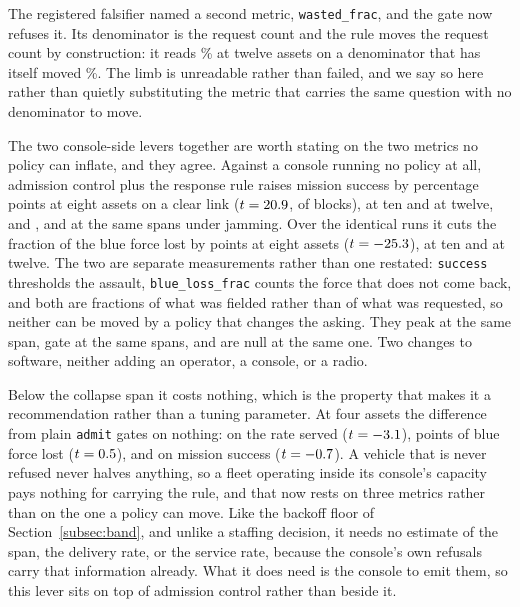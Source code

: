 \documentclass[11pt]{article}
\begin{document}
The registered falsifier named a second metric, \texttt{wasted\_frac}, and the gate now refuses it. Its denominator is the request count and the rule moves the request count by construction: it reads \abWfMove\% at twelve assets on a denominator that has itself moved \abWfDenom\%. The limb is unreadable rather than failed, and we say so here rather than quietly substituting the metric that carries the same question with no denominator to move.

The two console-side levers together are worth stating on the two metrics no policy can inflate, and they agree. Against a console running no policy at all, admission control plus the response rule raises mission success by \aiStackClearEight{} percentage points at eight assets on a clear link ($t = 20.9{}$, \aiStackClearEightBlocks{} of \aiBlocks{} blocks), \aiStackClearTen{} at ten and \aiStackClearTwelve{} at twelve, and \aiStackJamEight{}, \aiStackJamTen{} and \aiStackJamTwelve{} at the same spans under jamming. Over the identical runs it cuts the fraction of the blue force lost by \rtLossStackOverBlindClearEight{} points at eight assets ($t = -25.3{}$), \rtLossStackOverBlindClearTen{} at ten and \rtLossStackOverBlindClearTwelve{} at twelve. The two are separate measurements rather than one restated: \texttt{success} thresholds the assault, \texttt{blue\_loss\_frac} counts the force that does not come back, and both are fractions of what was fielded rather than of what was requested, so neither can be moved by a policy that changes the asking. They peak at the same span, gate at the same spans, and are null at the same one. Two changes to software, neither adding an operator, a console, or a radio.

Below the collapse span it costs nothing, which is the property that makes it a recommendation rather than a tuning parameter. At four assets the difference from plain \texttt{admit} gates on nothing: \rtServedAimdOverAdmitClearFour{} on the rate served ($t = -3.1{}$), \rtLossAimdOverAdmitClearFour{} points of blue force lost ($t = 0.5{}$), and \aiSuccClearGainFour{} on mission success ($t = -0.7{}$). A vehicle that is never refused never halves anything, so a fleet operating inside its console's capacity pays nothing for carrying the rule, and that now rests on three metrics rather than on the one a policy can move. Like the backoff floor of Section~\ref{subsec:band}, and unlike a staffing decision, it needs no estimate of the span, the delivery rate, or the service rate, because the console's own refusals carry that information already. What it does need is the console to emit them, so this lever sits on top of admission control rather than beside it.
\end{document}
